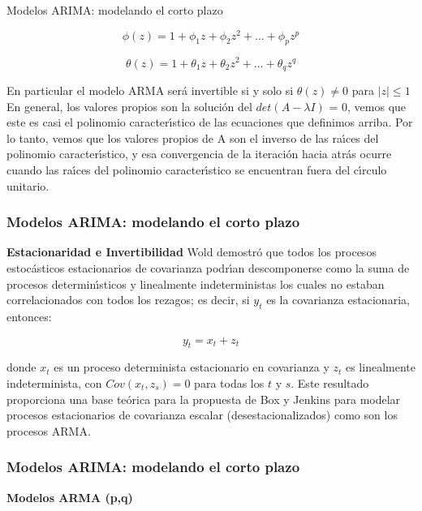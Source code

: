 \documentclass[spanish,xcolor=table]{beamer}
\begin{document}
\begin{section}{Modelos ARIMA: modelando el corto plazo}
\begin{frame}
\begin{equation}
\phi (z) = 1 + \phi_1 z + \phi_2 z^2 + \dots{} + \phi_p z^p
\end{equation}

\begin{equation}
\theta(z) =  1 + \theta_1 z + \theta_2 z^2 + \dots{} + \theta_q z^q
\end{equation}

En particular el modelo ARMA ser\'a invertible si y solo si $\theta(z) \ne 0$ para $|z| \le 1$
En general, los valores propios son la soluci\'on del $det (A - \lambda I)$ = 0, vemos que este es casi el polinomio caracter\'{\i}stico de las ecuaciones que definimos arriba. Por lo tanto, vemos que los valores propios de A son el inverso de las ra\'{\i}ces del polinomio caracter\'{\i}stico, y esa convergencia de la iteraci\'on hacia atr\'as ocurre cuando las ra\'{\i}ces del polinomio caracter\'{\i}stico se encuentran fuera del c\'{\i}rculo unitario.

\end{frame}
\begin{frame}
\frametitle{Modelos ARIMA: modelando el corto plazo}

\textbf{Estacionaridad e Invertibilidad}
Wold demostr\'o que todos los procesos estoc\'asticos estacionarios de covarianza podr\'{\i}an descomponerse como la suma de
procesos determin\'{\i}sticos y linealmente indeterministas los cuales no estaban correlacionados con todos los rezagos; es decir,
si $y_t$ es la covarianza estacionaria, entonces:

\begin{equation}
y_t = x_t + z_t
\end{equation}

donde $x_t$ es un proceso determinista estacionario en covarianza y $z_t$ es linealmente indeterminista,
con $Cov (x_t, z_s) = 0$ para todas los $t$ y $s$. Este resultado proporciona una base te\'orica para la propuesta de Box y Jenkins  para modelar procesos estacionarios de covarianza escalar (desestacionalizados) como son los procesos ARMA.
\end{frame}
\begin{frame}
\frametitle{Modelos ARIMA: modelando el corto plazo}

\textbf{Modelos ARMA (p,q)}


\end{frame}
\end{section}
\end{document}
